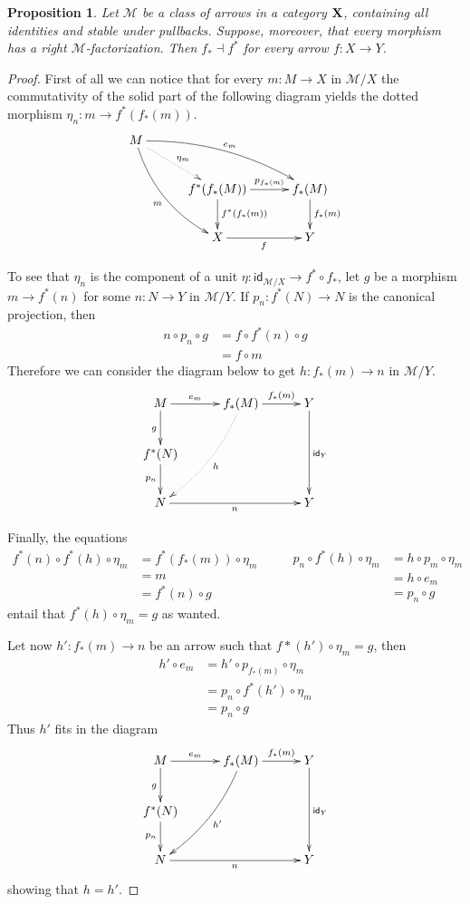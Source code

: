\documentclass[a4paper]{article}
\newcommand{\id}[1]{\mathsf{id}_{#1}}
\def\X{\textbf {\textup{X}}}
\newtheorem{proposition}[theorem]{Proposition}
\theoremstyle{definition}
\begin{document}
\begin{proposition}\label{prop:part}
	Let $\mathcal{M}$ be a class of arrows  in a category $\X$, containing  all identities and stable under pullbacks. Suppose, moreover, that every morphism has a right $\mathcal{M}$-factorization. Then $f_*\dashv f^*$ for every arrow $f\colon X\to Y$.  
\end{proposition}
\begin{proof}
	First of all we can notice that for every $m\colon M\to X$ in $\mathcal{M}/X$ the commutativity of the solid part of the following diagram yields the dotted morphism $\eta_n\colon m\to f^*(f_*(m))$.
	\[\xymatrix@C=30pt{M \ar@{.>}[dr]^{\eta_m} \ar@/^.4cm/[drr]^{e_m} \ar@/_.4cm/[ddr]_{m}\\ & f^*(f_*(M)) \ar[d]^{f^*(f_*(m))}\ar[r]^-{p_{f_*(m)}}& f_*(M) \ar[d]^{f_*(m)}\\ & X\ar[r]_f & Y}\]
	
	To see that $\eta_n$ is the component of a unit $\eta\colon \id{\mathcal{M}/X}\to f^*\circ f_*$, let $g$ be a morphism $m\to f^*(n)$ for some $n\colon N\to Y$ in $\mathcal{M}/Y$. If $p_n:f^*(N)\to N$ is the canonical projection, then 
	\begin{align*}
		n\circ p_n\circ g&=f\circ f^*(n)\circ g\\&=f\circ m
	\end{align*}
	Therefore we can consider the diagram below to get $h\colon f_*(m)\to n$ in $\mathcal{M}/Y$. 
	\[\xymatrix@C=30pt{M \ar[r]^-{e_m} \ar[d]_{g}& f_*(M) \ar[r]^-{f_*(m)}\ar@{.>}@/^.3cm/[ddl]^{h} & Y \ar[dd]^{\id{Y}}\\f^*(N) \ar[d]_{p_n}\\N \ar[rr]_{n}&& Y}\]
	
	Finally, the equations
	\[\begin{split}
		f^*(n)\circ f^*(h)\circ \eta_m&=f^*(f_*(m))\circ \eta_m\\&=m\\&=f^*(n)\circ g
	\end{split} \qquad \begin{split}
		p_n\circ f^*(h)\circ \eta_m&=h\circ p_m\circ \eta_m\\&=h\circ e_m\\&=p_n\circ g
	\end{split}\]
	entail that $f^*(h)\circ \eta_m=g$ as wanted.
	
	Let now $h'\colon f_*(m)\to n$ be an arrow such that $f*(h')\circ \eta_m=g$, then
	\begin{align*}
		h'\circ e_m&=h'\circ p_{f_*(m)}\circ \eta_m\\&=p_n\circ f^*(h')\circ \eta_m\\&=p_n\circ g
	\end{align*}
	Thus $h'$ fits in the diagram
	\[\xymatrix@C=30pt{M \ar[r]^-{e_m} \ar[d]_{g}& f_*(M) \ar[r]^-{f_*(m)}\ar@/^.3cm/[ddl]^{h'} & Y \ar[dd]^{\id{Y}}\\f^*(N) \ar[d]_{p_n}\\N \ar[rr]_{n}&& Y}\]
	showing that $h=h'$.	
\end{proof}
\end{document}
